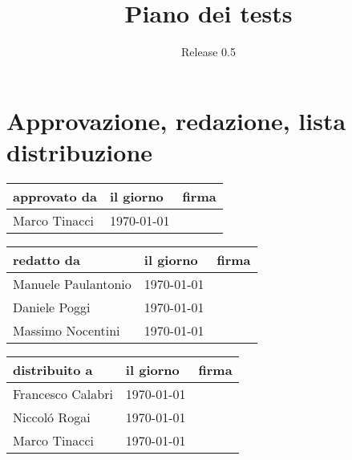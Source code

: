 \documentclass[a4paper, 12pt]{report}
\title{Piano dei tests}
\author{Release 0.5}
\date{\today \\Firenze \\\begin{figure}[h] \centering 
\texttt{[image: ../images/logokiwi.png]} \end{figure} }
\begin{document}
\maketitle

\section*{Approvazione, redazione, lista distribuzione}
\begin{table}[h!]
  \begin{center}
    \begin{tabular}{| l | l | p{60mm} |}
    \hline
    \textbf{approvato da} & \textbf{il giorno} & \textbf{firma} \\
	\hline    
	Marco Tinacci & \today &  \\
    \hline
    \end{tabular}
  \end{center}
\end{table}

\begin{table}[h!]
  \begin{center}
    \begin{tabular}{| l | l | p{60mm} |}
    \hline
    \textbf{redatto da} & \textbf{il giorno} & \textbf{firma} \\
	\hline    
	Manuele Paulantonio & \today &  \\
    \hline
	Daniele Poggi & \today &  \\
    \hline
	Massimo Nocentini & \today &  \\
    \hline
    \end{tabular}
  \end{center}
\end{table}

\begin{table}[h!]
  \begin{center}
    \begin{tabular}{| l | l | p{60mm} |}
    \hline
    \textbf{distribuito a} & \textbf{il giorno} & \textbf{firma} \\
	\hline    
	Francesco Calabri & \today &  \\
    \hline
	Niccol\'o Rogai & \today &  \\
    \hline
	Marco Tinacci & \today &  \\
    \hline
    \end{tabular}
  \end{center}
\end{table}
\end{document}
